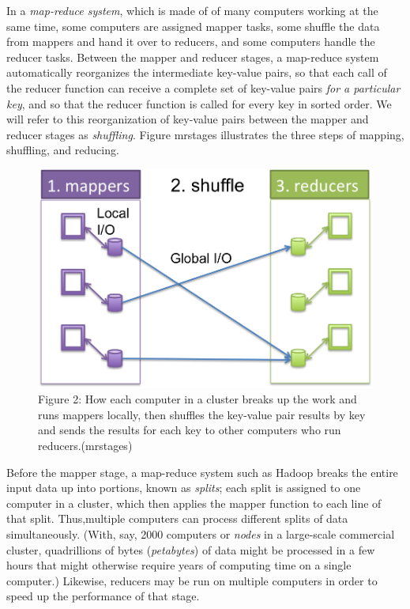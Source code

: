\documentclass[letterpaper,10pt,openany,oneside]{sphinxmanual}
\begin{document}
In a \emph{map-reduce system}, which is made of of many computers
working at the same time, some computers are assigned mapper tasks,
some shuffle the data from mappers and hand it over to reducers,
and some computers handle the reducer tasks. Between the mapper and
reducer stages, a map-reduce system automatically reorganizes the
intermediate key-value pairs, so that each call of the reducer
function can receive a complete set of key-value pairs
\emph{for a particular key}, and so that the reducer function is called
for every key in sorted order. We will refer to this reorganization
of key-value pairs between the mapper and reducer stages as
\emph{shuffling}. Figure mrstages illustrates the three steps of
mapping, shuffling, and reducing.
\begin{figure}[htbp]
\centering
\capstart

\includegraphics{Figure2.png}
\caption{Figure 2: How each computer in a cluster breaks up the work and runs
mappers locally, then shuffles the key-value pair results by key and
sends the results for each key to other computers who run reducers.(mrstages)}\end{figure}

Before the mapper stage, a map-reduce system such as Hadoop breaks
the entire input data up into portions, known as \emph{splits}; each
split is assigned to one computer in a cluster, which then applies
the mapper function to each line of that split. Thus,multiple
computers can process different splits of data simultaneously.
(With, say, 2000 computers or \emph{nodes} in a large-scale commercial
cluster, quadrillions of bytes (\emph{petabytes}) of data might be
processed in a few hours that might otherwise require years of
computing time on a single computer.) Likewise, reducers may be run
on multiple computers in order to speed up the performance of that
stage.
\end{document}
